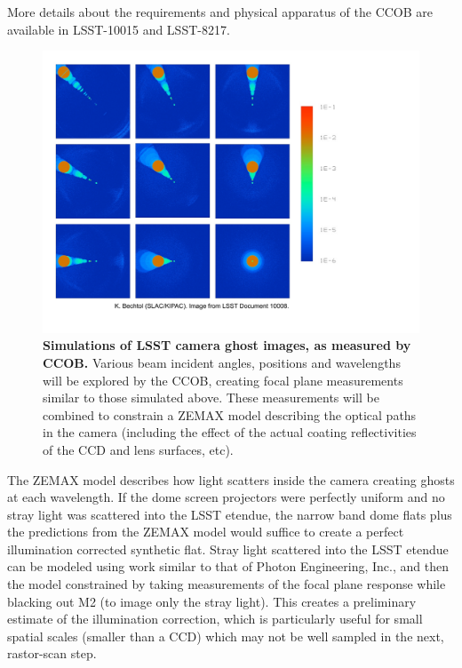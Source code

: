\documentclass[12pt,preprint]{aastex}
\begin{document}
More details about the requirements and physical apparatus of the CCOB
are available in LSST-10015 and LSST-8217.

\begin{figure}[htbp]
\begin{center}
\includegraphics[angle=90,width=6in]{ghost_images}
\end{center}
\caption{ {\small
{\bf Simulations of LSST camera ghost images, as measured by CCOB. }
Various beam incident angles, positions and wavelengths will be
explored by the CCOB, creating focal plane measurements similar to
those simulated above. These measurements will be combined to
constrain a ZEMAX model describing the optical paths in the camera
(including the effect of the actual coating reflectivities of the CCD
and lens surfaces, etc). 
\label{fig:ghostimage}
} }
\end{figure}

The ZEMAX model describes how light scatters inside the camera
creating ghosts at each wavelength. If the dome screen projectors were
perfectly uniform and no stray light was scattered into the LSST
etendue, the narrow band dome flats plus the predictions from the
ZEMAX model would suffice to create a perfect illumination corrected
synthetic flat. Stray light scattered into the LSST etendue can be
modeled using work similar to that of Photon Engineering, Inc., and
then the model constrained by taking measurements of the focal plane
response while blacking out M2 (to image only the stray light). This
creates a preliminary estimate of the illumination correction, which
is particularly useful for small spatial scales (smaller than a CCD)
which may not be well sampled in the next, rastor-scan step.
\end{document}

